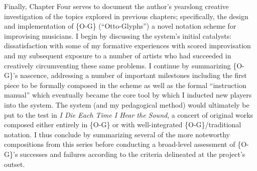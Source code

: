 
Finally, Chapter Four serves to document the author's yearslong creative investigation of the topics explored in previous chapters; specifically, the design and implementation of \{O-G\} (``Otto-Glyphs'') a novel notation scheme for improvising musicians.
I begin by discussing the system's initial catalysts: dissatisfaction with some of my formative experiences with scored improvisation and my subsequent exposure to a number of artists who had succeeded in creatively circumventing these same problems.
I continue by summarizing \{O-G\}'s nascence, addressing a number of important milestones including the first piece to be formally composed in the scheme as well as the formal ``instruction manual'' which eventually became the core tool by which I inducted new players into the system.
The system (and my pedagogical method) would ultimately be put to the test in \textit{I Die Each Time I Hear the Sound}, a concert of original works composed either entirely in \{O-G\} or with well-integrated \{O-G\}/traditional notation.
I thus conclude by summarizing several of the more noteworthy compositions from this series before conducting a broad-level assessment of \{O-G\}'s successes and failures according to the criteria delineated at the project's outset.



